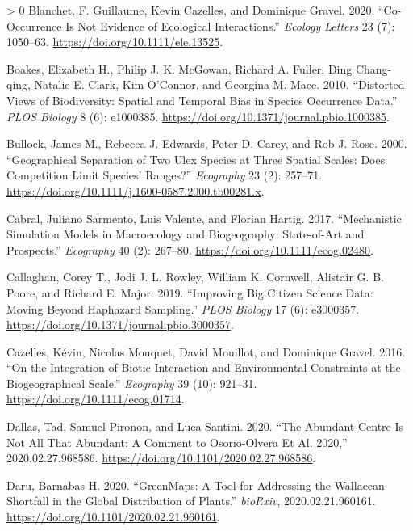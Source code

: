 \documentclass[10pt,oneside]{article}
\newlength{\cslhangindent}
\newenvironment{CSLReferences}[3] %
 {%
  \setlength{\parindent}{0pt}
  \ifodd #1 \everypar{\setlength{\hangindent}{\cslhangindent}}\ignorespaces\fi
  \ifnum #2 > 0
  \setlength{\parskip}{#2\baselineskip}
  \fi
 }%
 {}
\begin{document}
\begin{CSLReferences}{1}{0}
\leavevmode\hypertarget{ref-Blanchet2020CooNot}{}%
Blanchet, F. Guillaume, Kevin Cazelles, and Dominique Gravel. 2020.
{``Co-Occurrence Is Not Evidence of Ecological Interactions.''}
\emph{Ecology Letters} 23 (7): 1050--63.
\url{https://doi.org/10.1111/ele.13525}.

\leavevmode\hypertarget{ref-Boakes2010DisVie}{}%
Boakes, Elizabeth H., Philip J. K. McGowan, Richard A. Fuller, Ding
Chang-qing, Natalie E. Clark, Kim O'Connor, and Georgina M. Mace. 2010.
{``Distorted Views of Biodiversity: Spatial and Temporal Bias in Species
Occurrence Data.''} \emph{PLOS Biology} 8 (6): e1000385.
\url{https://doi.org/10.1371/journal.pbio.1000385}.

\leavevmode\hypertarget{ref-Bullock2000GeoSep}{}%
Bullock, James M., Rebecca J. Edwards, Peter D. Carey, and Rob J. Rose.
2000. {``Geographical Separation of Two Ulex Species at Three Spatial
Scales: Does Competition Limit Species' Ranges?''} \emph{Ecography} 23
(2): 257--71. \url{https://doi.org/10.1111/j.1600-0587.2000.tb00281.x}.

\leavevmode\hypertarget{ref-Cabral2017MecSim}{}%
Cabral, Juliano Sarmento, Luis Valente, and Florian Hartig. 2017.
{``Mechanistic Simulation Models in Macroecology and Biogeography:
State-of-Art and Prospects.''} \emph{Ecography} 40 (2): 267--80.
\url{https://doi.org/10.1111/ecog.02480}.

\leavevmode\hypertarget{ref-Callaghan2019ImpBig}{}%
Callaghan, Corey T., Jodi J. L. Rowley, William K. Cornwell, Alistair G.
B. Poore, and Richard E. Major. 2019. {``Improving Big Citizen Science
Data: Moving Beyond Haphazard Sampling.''} \emph{PLOS Biology} 17 (6):
e3000357. \url{https://doi.org/10.1371/journal.pbio.3000357}.

\leavevmode\hypertarget{ref-Cazelles2016IntBio}{}%
Cazelles, Kévin, Nicolas Mouquet, David Mouillot, and Dominique Gravel.
2016. {``On the Integration of Biotic Interaction and Environmental
Constraints at the Biogeographical Scale.''} \emph{Ecography} 39 (10):
921--31. \url{https://doi.org/10.1111/ecog.01714}.

\leavevmode\hypertarget{ref-Dallas2020AbuNot}{}%
Dallas, Tad, Samuel Pironon, and Luca Santini. 2020. {``The
Abundant-Centre Is Not All That Abundant: A Comment to Osorio-Olvera Et
Al. 2020,''} 2020.02.27.968586.
\url{https://doi.org/10.1101/2020.02.27.968586}.

\leavevmode\hypertarget{ref-Daru2020GreToo}{}%
Daru, Barnabas H. 2020. {``GreenMaps: A Tool for Addressing the
Wallacean Shortfall in the Global Distribution of Plants.''}
\emph{bioRxiv}, 2020.02.21.960161.
\url{https://doi.org/10.1101/2020.02.21.960161}.


\end{CSLReferences}
\end{document}
